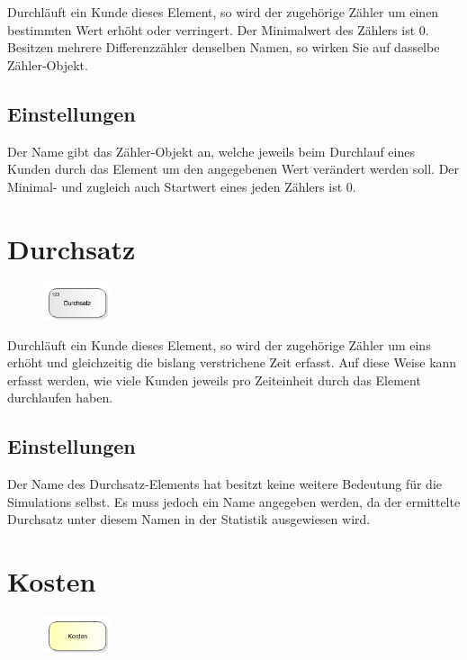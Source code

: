 Durchläuft ein Kunde dieses Element, so wird der zugehörige Zähler um einen bestimmten Wert erhöht oder verringert.
Der Minimalwert des Zählers ist 0. Besitzen mehrere Differenzzähler denselben Namen, so wirken Sie auf dasselbe
Zähler-Objekt.

\subsection*{Einstellungen}

Der Name gibt das Zähler-Objekt an, welche jeweils beim Durchlauf eines Kunden durch das Element um den
angegebenen Wert verändert werden soll. Der Minimal- und zugleich auch Startwert eines jeden Zählers ist 0.


\section{Durchsatz}
\label{ref:ModelElementThroughput}

\begin{figure}
\vspace{-22pt}
\includegraphics[width=2cm]{imageModelElementThroughput.png}
\vspace{-22pt}
\end{figure}

Durchläuft ein Kunde dieses Element, so wird der zugehörige Zähler um eins erhöht und gleichzeitig die
bislang verstrichene Zeit erfasst. Auf diese Weise kann erfasst werden,
wie viele Kunden jeweils pro Zeiteinheit durch das Element durchlaufen haben.

\subsection*{Einstellungen}

Der Name des Durchsatz-Elements hat besitzt keine weitere Bedeutung für die Simulations selbst.
Es muss jedoch ein Name angegeben werden, da der ermittelte Durchsatz unter diesem Namen in der
Statistik ausgewiesen wird.


\section{Kosten}
\label{ref:ModelElementCosts}

\begin{figure}
\vspace{-22pt}
\includegraphics[width=2cm]{imageModelElementCosts.png}
\vspace{-22pt}
\end{figure}

